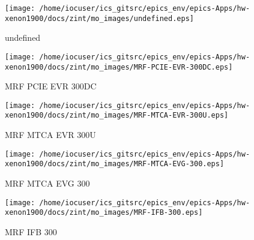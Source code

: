 \noindent
\vspace{1.4cm}
\begin{minipage}{.2\textwidth}
\begin{center}
\texttt{[image: /home/iocuser/ics\_gitsrc/epics\_env/epics-Apps/hw-xenon1900/docs/zint/mo\_images/undefined.eps]}
\end{center}
\end{minipage}
\begin{minipage}{.7\textwidth}
undefined
\end{minipage}


\noindent
\vspace{1.4cm}
\begin{minipage}{.2\textwidth}
\begin{center}
\texttt{[image: /home/iocuser/ics\_gitsrc/epics\_env/epics-Apps/hw-xenon1900/docs/zint/mo\_images/MRF-PCIE-EVR-300DC.eps]}
\end{center}
\end{minipage}
\begin{minipage}{.7\textwidth}
MRF PCIE EVR 300DC
\end{minipage}


\noindent
\vspace{1.4cm}
\begin{minipage}{.2\textwidth}
\begin{center}
\texttt{[image: /home/iocuser/ics\_gitsrc/epics\_env/epics-Apps/hw-xenon1900/docs/zint/mo\_images/MRF-MTCA-EVR-300U.eps]}
\end{center}
\end{minipage}
\begin{minipage}{.7\textwidth}
MRF MTCA EVR 300U
\end{minipage}


\noindent
\vspace{1.4cm}
\begin{minipage}{.2\textwidth}
\begin{center}
\texttt{[image: /home/iocuser/ics\_gitsrc/epics\_env/epics-Apps/hw-xenon1900/docs/zint/mo\_images/MRF-MTCA-EVG-300.eps]}
\end{center}
\end{minipage}
\begin{minipage}{.7\textwidth}
MRF MTCA EVG 300
\end{minipage}


\noindent
\vspace{1.4cm}
\begin{minipage}{.2\textwidth}
\begin{center}
\texttt{[image: /home/iocuser/ics\_gitsrc/epics\_env/epics-Apps/hw-xenon1900/docs/zint/mo\_images/MRF-IFB-300.eps]}
\end{center}
\end{minipage}
\begin{minipage}{.7\textwidth}
MRF IFB 300
\end{minipage}



